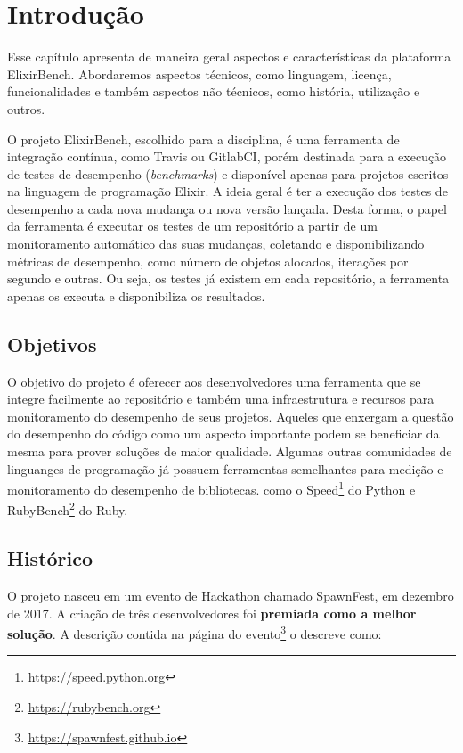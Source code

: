 \chapter{Introdução}
\label{cap:introducao}

Esse capítulo apresenta de maneira geral aspectos e características da plataforma
ElixirBench. Abordaremos aspectos técnicos, como linguagem, licença, funcionalidades
e também aspectos não técnicos, como história, utilização e outros.

O projeto ElixirBench, escolhido para a disciplina, é uma ferramenta
de integração contínua, como Travis ou GitlabCI, porém destinada para a execução
de testes de desempenho (\textit{benchmarks}) e disponível apenas para projetos escritos na
linguagem de programação Elixir. A ideia geral é ter a execução dos testes
de desempenho a cada nova mudança ou nova versão lançada. Desta forma, o
papel da ferramenta é executar os testes de um repositório a partir de um monitoramento
automático das suas mudanças, coletando e disponibilizando métricas de desempenho,
como número de objetos alocados, iterações por segundo e outras. Ou seja, os
testes já existem em cada repositório, a ferramenta apenas os executa e disponibiliza
os resultados.

\section{Objetivos}

 O objetivo do projeto é oferecer aos desenvolvedores uma ferramenta que se integre
 facilmente ao repositório e também uma infraestrutura e recursos
 para monitoramento do desempenho de seus projetos. Aqueles que enxergam a questão
 do desempenho do código como um aspecto importante podem se beneficiar da mesma
 para prover soluções de maior qualidade. Algumas outras comunidades de linguanges
 de programação já possuem ferramentas semelhantes para medição e monitoramento do desempenho de bibliotecas.
 como o Speed\footnote{\url{https://speed.python.org}} do Python e RubyBench\footnote{\url{https://rubybench.org}} do Ruby.

\section{Histórico}

 O projeto nasceu em um evento de Hackathon chamado SpawnFest, em dezembro
 de 2017. A criação de três desenvolvedores foi \textbf{premiada como a melhor solução}.
 A descrição contida na página do evento\footnote{\url{https://spawnfest.github.io}} o descreve como:

